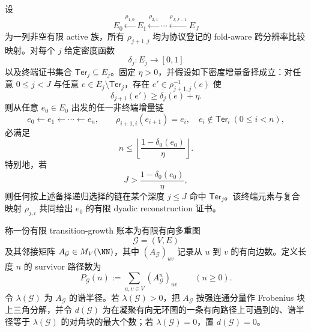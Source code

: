 \begin{theorem}\label{distill:bourgain-entropy_increment_closure-fold-aware-density-increment-stopping}
设
\[
E_0\xleftarrow{\rho_{1,0}}E_1\xleftarrow{\rho_{2,1}}\cdots\xleftarrow{\rho_{J,J-1}}E_J
\]
为一列非空有限 active 族，所有 \(\rho_{j+1,j}\) 均为协议登记的 fold-aware 跨分辨率比较映射。对每个 \(j\) 给定密度函数
\[
\delta_j:E_j\longrightarrow [0,1]
\]
以及终端证书集合 \(\mathsf{Ter}_j\subseteq E_j\)。固定 \(\eta>0\)，并假设如下密度增量备择成立：对任意 \(0\le j<J\) 与任意 \(e\in E_j\setminus\mathsf{Ter}_j\)，存在 \(e'\in\rho_{j+1,j}^{-1}(e)\) 使
\[
\delta_{j+1}(e')\ge \delta_j(e)+\eta.
\]
则从任意 \(e_0\in E_0\) 出发的任一非终端增量链
\[
e_0\xleftarrow{}e_1\xleftarrow{}\cdots\xleftarrow{}e_n,
\qquad
\rho_{i+1,i}(e_{i+1})=e_i,\quad e_i\notin\mathsf{Ter}_i\ (0\le i<n),
\]
必满足
\[
n\le \left\lfloor \frac{1-\delta_0(e_0)}{\eta}\right\rfloor.
\]
特别地，若
\[
J>\frac{1-\delta_0(e_0)}{\eta},
\]
则任何按上述备择递归选择的链在某个深度 \(j\le J\) 命中 \(\mathsf{Ter}_j\)。该终端元素与复合映射 \(\rho_{j,i}\) 共同给出 \(e_0\) 的有限 dyadic reconstruction 证书。
\end{theorem}
\begin{definition}\label{def:distill-stallings-fold-survivor-transition-growth-ledger}
称一份有限 transition-growth 账本为有限有向多重图
\[
\mathcal G=(V,E)
\]
及其邻接矩阵 \(A_{\mathcal G}\in M_V(\NN)\)，其中 \((A_{\mathcal G})_{uv}\) 记录从 \(u\) 到 \(v\) 的有向边数。定义长度 \(n\) 的 survivor 路径数为
\[
P_{\mathcal G}(n):=\sum_{u,v\in V}(A_{\mathcal G}^n)_{uv}\qquad(n\ge0).
\]
令 \(\lambda(\mathcal G)\) 为 \(A_{\mathcal G}\) 的谱半径。若 \(\lambda(\mathcal G)>0\)，把 \(A_{\mathcal G}\) 按强连通分量作 Frobenius 块上三角分解，并令 \(d(\mathcal G)\) 为在凝聚有向无环图的一条有向路径上可遇到的、谱半径等于 \(\lambda(\mathcal G)\) 的对角块的最大个数；若 \(\lambda(\mathcal G)=0\)，置 \(d(\mathcal G)=0\)。
\end{definition}


